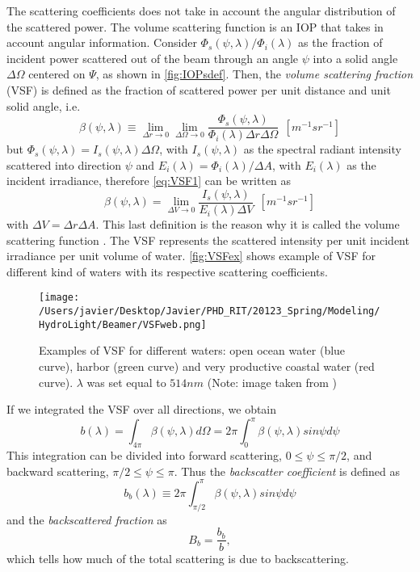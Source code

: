 The scattering coefficients does not take in account the angular distribution of the scattered power. The volume scattering function is an IOP that takes in account angular information. Consider $\Phi_s(\psi,\lambda)/\Phi_i(\lambda)$ as the fraction of incident power scattered out of the beam through an angle $\psi$ into a solid angle $\Delta\Omega$ centered on $\Psi$, as shown in \autoref{fig:IOPsdef}. Then, the {\it volume scattering fraction} (VSF)  is defined as the fraction of scattered power per unit distance and unit solid angle, i.e.
\begin{equation}\label{eq:VSF1}
  \beta(\psi,\lambda)\equiv \lim_{\Delta r\to 0} \lim_{\Delta \Omega\to 0}  \frac{\Phi_s(\psi,\lambda)}{\Phi_i(\lambda)\Delta r\Delta \Omega}~~\left[m^{-1}sr^{-1} \right]
\end{equation}
but $\Phi_s(\psi,\lambda)=I_s(\psi,\lambda)\Delta \Omega$, with $I_s(\psi,\lambda)$ as the spectral radiant intensity scattered into direction $\psi$ and $E_i(\lambda)=\Phi_i(\lambda)/\Delta A$, with $E_i(\lambda)$ as the incident irradiance, therefore \autoref{eq:VSF1} can be written as
\begin{equation} 
  \beta(\psi,\lambda)= \lim_{\Delta V\to 0} \frac{I_s(\psi,\lambda)}{E_i(\lambda)\Delta V}~~\left[m^{-1}sr^{-1} \right]
\end{equation}
with $\Delta V=\Delta r\Delta A$. This last definition is the reason why it is called the volume scattering function \cite{Mobley:2001}. The VSF represents the scattered intensity per unit incident irradiance per unit volume of water. \autoref{fig:VSFex} shows example of VSF for different kind of waters with its respective scattering coefficients.

\begin{figure}[htb]
\centering
      \texttt{[image: /Users/javier/Desktop/Javier/PHD\_RIT/20123\_Spring/Modeling/HydroLight/Beamer/VSFweb.png]}
      \caption{Examples of VSF for different waters: open ocean water (blue curve), harbor (green curve) and very productive coastal water (red curve). $\lambda$ was set equal to $514nm$ (Note: image taken from \cite{Mobley:2001})}
      \label{fig:VSFex}
\end{figure}

If we integrated the VSF over all directions, we obtain
\begin{equation}
  b(\lambda)=\int_{4\pi} \beta(\psi,\lambda)d\Omega=2\pi\int_0^\pi \beta(\psi,\lambda)sin\psi d\psi
\end{equation}
This integration can be divided into forward scattering, $0\leq\psi\leq\pi/2$, and backward scattering, $\pi/2\leq\psi\leq\pi$. Thus the {\it backscatter coefficient}  is defined as
\begin{equation}
  b_b(\lambda)\equiv 2\pi\int_{\pi/2}^\pi \beta(\psi,\lambda)sin\psi d\psi
\end{equation}
and the {\it backscattered fraction}  as 
\begin{equation}
  B_b=\frac{b_b}{b},
\end{equation}
which tells how much of the total scattering is due to backscattering.

